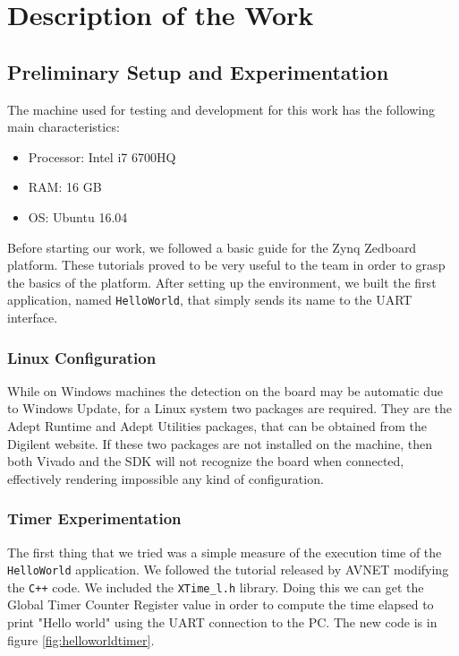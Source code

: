 \chapter{Description of the Work}
\label{chapter:description}
\section{Preliminary Setup and Experimentation}

The machine used for testing and development for this work has the following main characteristics:

\begin{itemize}[noitemsep]
	\item Processor: Intel i7 6700HQ
	\item RAM: 16 GB
	\item OS: Ubuntu 16.04
\end{itemize}

Before starting our work, we followed a basic guide \cite{tutorial} for the Zynq Zedboard platform. These tutorials proved to be very useful to the team in order to grasp the basics of the platform. After setting up the environment, we built the first application, named \texttt{HelloWorld}, that simply sends its name to the UART interface.

\subsection{Linux Configuration}

While on Windows machines the detection on the board may be automatic due to Windows Update, for a Linux system two packages are required. They are the Adept Runtime and Adept Utilities packages, that can be obtained from the Digilent website. If these two packages are not installed on the machine, then both Vivado and the SDK will not recognize the board when connected, effectively rendering impossible any kind of configuration.

\subsection{Timer Experimentation}
The first thing that we tried was a simple measure of the execution time of the \texttt{HelloWorld} application. We followed the tutorial released by AVNET modifying the \texttt{C++} code. We included the \texttt{XTime\_l.h} library. Doing this we can get the Global Timer Counter Register value in order to compute the time elapsed to print "Hello world" using the UART connection to the PC. The new code is in figure \ref{fig:helloworldtimer}.

